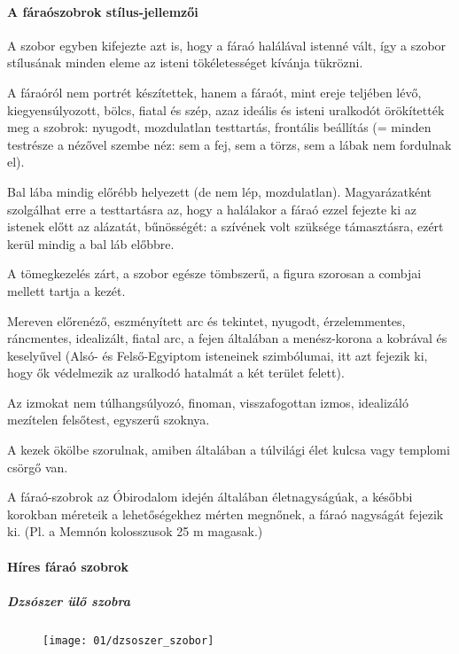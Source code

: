 \paragraph{A fáraószobrok stílus-jellemzői}

A szobor egyben kifejezte azt is, hogy a fáraó halálával istenné vált, így a szobor stílusának minden eleme az isteni tökéletességet kívánja tükrözni.

A fáraóról nem portrét készítettek, hanem a fáraót, mint ereje teljében lévő, kiegyensúlyozott, bölcs, fiatal és szép, azaz ideális és isteni uralkodót örökítették meg a szobrok: nyugodt, mozdulatlan testtartás, frontális beállítás (= minden testrésze a nézővel szembe néz: sem a fej, sem a törzs, sem a lábak nem fordulnak el).

Bal lába mindig előrébb helyezett (de nem lép, mozdulatlan). Magyarázatként szolgálhat erre a testtartásra az, hogy a halálakor a fáraó ezzel fejezte ki az istenek előtt az alázatát, bűnösségét: a szívének volt szüksége támasztásra, ezért kerül mindig a bal láb előbbre.

A tömegkezelés zárt, a szobor egésze tömbszerű, a figura szorosan a combjai mellett tartja a kezét. 

Mereven előrenéző, eszményített arc és tekintet, nyugodt, érzelemmentes, ráncmentes, idealizált, fiatal arc, a fejen általában a menész-korona a kobrával és keselyűvel (Alsó- és Felső-Egyiptom isteneinek szimbólumai, itt azt fejezik ki, hogy ők védelmezik az uralkodó hatalmát a két terület felett).

Az izmokat nem túlhangsúlyozó, finoman, visszafogottan izmos, idealizáló mezítelen felsőtest, egyszerű szoknya.

A kezek ökölbe szorulnak, amiben általában a túlvilági élet kulcsa vagy templomi csörgő van. 

A fáraó-szobrok az Óbirodalom idején általában életnagyságúak, a későbbi korokban méreteik a lehetőségekhez mérten megnőnek, a fáraó nagyságát fejezik ki. (Pl. a Memnón kolosszusok 25 m magasak.)

\paragraph{Híres fáraó szobrok}

	\subparagraph{Dzsószer ülő szobra}
	
	\begin{figure}
		\begin{tcolorbox}[enhanced,colframe=gray!50!white,
			colbacktitle=white!15!white,
			coltitle=gray!50!black,
			borderline={0.5mm}{0mm}{gray!15!white},
			borderline={0.5mm}{0mm}{gray!50!white,dashed},
			attach boxed title to top center={yshift=-2mm},
			boxed title style={boxrule=0.4pt},
			title=Dzsószer szobra eredeti helyén]{
			\texttt{[image: 01/dzsoszer\_szobor]}}
		\end{tcolorbox}
	\end{figure} 

